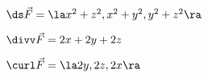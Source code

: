 {$\ds\vec F = \la x^2+z^2,x^2+y^2,y^2+z^2\ra$
}
{$\divv \vec F = 2x+2y+2z$

$\curl \vec F = \la 2y,2z,2x\ra$}
